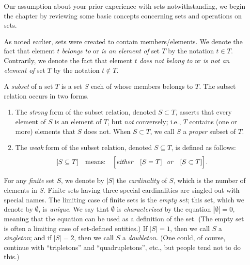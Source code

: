 Our assumption about your prior experience with sets notwithstanding, we begin the chapter by reviewing some basic concepts concerning sets and operations on sets.

\medskip

 
As noted earlier, sets were created to contain members/elements.  We denote the fact that element $t$ {\it belongs to} or {\it is an element of} set $T$ by the notation $t \in T$.  Contrarily,
we denote the fact that element $t$ {\it does not belong to} or {\it is not an element of} set $T$ by the notation $t \not\in T$. 

\smallskip

  
A {\em subset} of a set $T$ is a set $S$ each of whose members belongs to $T$.  The subset relation occurs in two forms.
\begin{enumerate}
\item
The {\em strong} form of the subset relation, denoted $S \subset T$, asserts that every element of $S$ is an element of $T$, but {\em not} conversely; i.e., $T$ contains (one or more) elements that $S$ does not.   When $S \subset T$, we call $S$ a {\em proper} subset of $T$.

\medskip\item
The {\em weak} form of the subset relation, denoted $S \subseteq T$, is defined as follows:
\[
[S \subseteq T] \ \ \mbox{ means: } \ \
\Big[ \mbox{\em either } \ \ [S = T]
\ \ \mbox{\em or } \ \ [S \subset T] \Big].
\]
\end{enumerate}

   
\index{set!empty set} \index{set!doubleton (set)}
 
For any {\em finite} set $S$, we denote by $|S|$ the {\it cardinality} of $S$, which is the number of elements in $S$.  Finite sets having three special cardinalities are singled out with special names.  The limiting case of finite sets is the {\em empty set}; this set, which we denote by
$\emptyset$, is {\em unique}.  We say that $\emptyset$ is {\it characterized} by the equation $|\emptyset| = 0$, meaning that the equation can be used as a definition of the set.  (The empty set is often a limiting case of set-defined entities.)  If $|S| = 1$, then we call $S$ a {\em singleton}; and if $|S| = 2$, then we call $S$ a {\em doubleton}.  (One could, of course, continue with ``tripletons'' and ``quadrupletons'', etc., but people tend not to do this.)

